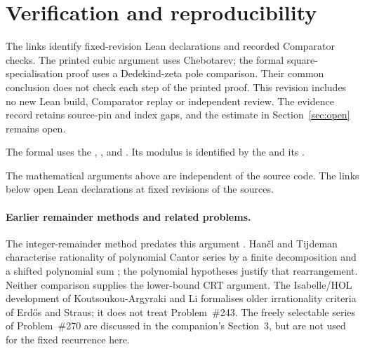 \documentclass[11pt]{article}
\begin{document}
\section{Verification and reproducibility}\label{app:verification}
\evidenceparagraph{\evidencerecordurl}
The links identify fixed-revision Lean declarations and recorded
Comparator checks. The printed cubic argument uses Chebotarev; the
formal square-specialisation proof uses a Dedekind-zeta pole comparison.
Their common conclusion does not check each step of the printed proof.
This revision includes no new Lean build, Comparator replay or independent
review. The evidence record retains source-pin and index gaps, and the
estimate in Section~\ref{sec:open} remains open.

\noindent The formal
 uses the
,
, and
. Its modulus is identified by the
 and its
.


\iffalse


The mathematical arguments above are independent of the source code.
The links below open Lean declarations at fixed revisions of the sources.

\paragraph{Earlier remainder methods and related problems.}
The integer-remainder method predates this argument
\cite[Theorem~2.1, pp.~85--86]{erdosstraus1974}.
Han\v{c}l and Tijdeman characterise rationality of polynomial Cantor
series by a finite decomposition and a shifted polynomial sum
\cite[Theorem~2.2 and its derivation, pp.~39--40]{hancltijdeman2008};
the polynomial hypotheses justify that rearrangement. Neither comparison
supplies the lower-bound CRT argument. The Isabelle/HOL
development of Koutsoukou-Argyraki and Li \cite{kouli2020} formalises
older irrationality criteria of Erd\H{o}s and Straus; it does not treat
Problem~\#243. The freely selectable series of
Problem~\#270 \cite[Theorems~1--2]{crmarickovac2025} are discussed in
the companion's Section~3, but are not used for the fixed recurrence here.
\end{document}
